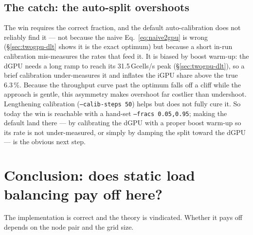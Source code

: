 \documentclass[
	english,
	letterpaper, oneside
]{article}
\begin{document}


\subsection{The catch: the auto-split overshoots}
\label{sec:twogpu-auto}

The win requires the correct fraction, and the default auto-calibration does not
reliably find it --- not because the naive Eq.~\eqref{eq:naive2gpu} is wrong (\S\ref{sec:twogpu-dlt}
shows it is the exact optimum) but because a short in-run calibration mis-measures the
rates that feed it. It is biased by boost warm-up: the dGPU needs a long ramp to reach
its 31.5\,Gcells/s peak (\S\ref{sec:twogpu-dlt}), so a brief calibration under-measures
it and inflates the iGPU share above the true 6.3\,\%. Because the throughput curve past
the optimum falls off a cliff while the approach is gentle, this asymmetry makes overshoot
far costlier than undershoot. Lengthening calibration (\texttt{--calib-steps 50}) helps
but does not fully cure it. So today the win is reachable with a hand-set
\texttt{--fracs 0.05,0.95}; making the default land there --- by calibrating the dGPU with
a proper boost warm-up so its rate is not under-measured, or simply by damping the split
toward the dGPU --- is the obvious next step.

\section{Conclusion: does static load balancing pay off here?}
\label{sec:conclusion}

The implementation is correct and the theory is vindicated. Whether it pays off
depends on the node pair and the grid size.
\end{document}
